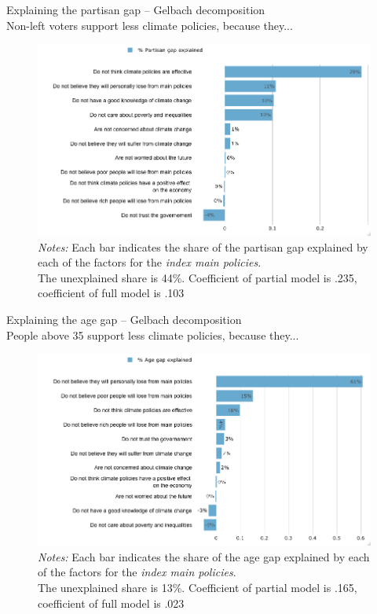 \begin{framefont}{\small}
\begin{frame}{Explaining the partisan gap -- Gelbach decomposition\\ Non-left voters support less climate policies, because they...}%
\begin{figure}[h!]
\includegraphics[width=.65\textwidth]{../figures/FR/gelbach_vote_agg_no_fairness_index_main_policies} \\
{\tiny \textit{Notes:} Each bar indicates the share of the partisan gap explained by each of the factors for the \textit{index main policies}.\\ The unexplained share is 44\%. Coefficient of partial model is .235, coefficient of full model is .103}
\end{figure}
\end{frame}

\begin{frame}{Explaining the age gap -- Gelbach decomposition \\ People above 35 support less climate policies, because they...}%
\begin{figure}[h!]
\includegraphics[width=.65\textwidth]{../figures/FR/gelbach_young_no_fairness_index_main_policies} \\
{\tiny \textit{Notes:} Each bar indicates the share of the age gap explained by each of the factors for the \textit{index main policies}.\\ The unexplained share is 13\%. Coefficient of partial model is .165, coefficient of full model is .023}
\end{figure}
\end{frame}



\end{framefont}
